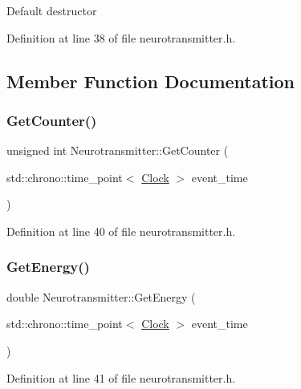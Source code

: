 Default destructor 

Definition at line 38 of file neurotransmitter.\+h.



\subsection{Member Function Documentation}
\mbox{\label{class_neurotransmitter_a94b3d1909cdd787f0583e28e1e9b58dd}} 
\subsubsection{\texorpdfstring{Get\+Counter()}{GetCounter()}}
{\footnotesize\ttfamily unsigned int Neurotransmitter\+::\+Get\+Counter (\begin{DoxyParamCaption}\item[{std\+::chrono\+::time\+\_\+point$<$ \hyperlink{universe_8h_a0ef8d951d1ca5ab3cfaf7ab4c7a6fd80}{Clock} $>$}]{event\+\_\+time }\end{DoxyParamCaption})\hspace{0.3cm}{\ttfamily [inline]}}



Definition at line 40 of file neurotransmitter.\+h.

\mbox{\label{class_neurotransmitter_a1e3e8134ea935f617b0afd2f7b5b5799}} 
\subsubsection{\texorpdfstring{Get\+Energy()}{GetEnergy()}}
{\footnotesize\ttfamily double Neurotransmitter\+::\+Get\+Energy (\begin{DoxyParamCaption}\item[{std\+::chrono\+::time\+\_\+point$<$ \hyperlink{universe_8h_a0ef8d951d1ca5ab3cfaf7ab4c7a6fd80}{Clock} $>$}]{event\+\_\+time }\end{DoxyParamCaption})\hspace{0.3cm}{\ttfamily [inline]}}



Definition at line 41 of file neurotransmitter.\+h.

